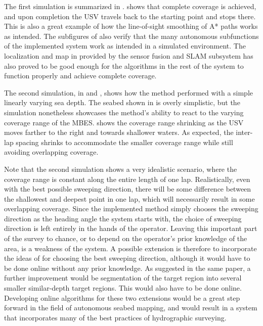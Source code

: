 The first simulation is summarized in .  shows that complete coverage is achieved, and upon completion the USV travels back to the starting point and stops there. This is also a great example of how the line-of-sight smoothing of A* paths works as intended. The subfigures of  also verify that the many autonomous subfunctions of the implemented system work as intended in a simulated environment. The localization and map in  provided by the sensor fusion and SLAM subsystem has also proved to be good enough for the algorithms in the rest of the system to function properly and achieve complete coverage.

The second simulation, in  and , shows how the method performed with a simple linearly varying sea depth. The seabed shown in  is overly simplistic, but the simulation nonetheless showcases the method's ability to react to the varying coverage range of the MBES. 
 shows the coverage range shrinking as the USV moves farther to the right and towards shallower waters. As expected, the inter-lap spacing shrinks to accommodate the smaller coverage range while still avoiding overlapping coverage.

Note that the second simulation shows a very idealistic scenario, where the coverage range is constant along the entire length of one lap. Realistically, even with the best possible sweeping direction, there will be some difference between the shallowest and deepest point in one lap, which will necessarily result in some overlapping coverage. Since the implemented method simply chooses the sweeping direction as the heading angle the system starts with, the choice of sweeping direction is left entirely in the hands of the operator. Leaving this important part of the survey to chance, or to depend on the operator's prior knowledge of the area, is a weakness of the system. A possible extension is therefore to incorporate the ideas of \citet{galceran2012efficient} for choosing the best sweeping direction, although it would have to be done online without any prior knowledge. As suggested in the same paper, a further improvement would be segmentation of the target region into several smaller similar-depth target regions. This would also have to be done online. Developing online algorithms for these two extensions would be a great step forward in the field of autonomous seabed mapping, and would result in a system that incorporates many of the best practices of hydrographic surveying.

